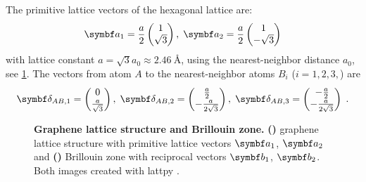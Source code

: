 \documentclass[../main.tex]{subfiles}
\begin{document}
The primitive lattice vectors of the hexagonal lattice are:
\begin{align}
	\vb{a}_1 = \frac{a}{2} \begin{pmatrix} 1 \\ \sqrt{3} \end{pmatrix}, \; \vb{a}_2 = \frac{a}{2} \begin{pmatrix} 1 \\ -\sqrt{3} \end{pmatrix}
\end{align}
with lattice constant \(a = \sqrt{3} a_0 \approx \SI{2.46}{\angstrom}\), using the nearest-neighbor distance \(a_0\), see \cref{sfig:graphene lattice structure}.
The vectors from atom \(A\) to the nearest-neighbor atoms \(B_i\) (\(i = 1, 2, 3,\)) are
\begin{align}
	\vb{\delta}_{AB, 1} = \begin{pmatrix} 0 \\ \frac{a}{\sqrt{3}} \end{pmatrix},\; \vb{\delta}_{AB, 2} = \begin{pmatrix} \frac{a}{2} \\ -\frac{a}{2\sqrt{3}} \end{pmatrix},\; \vb{\delta}_{AB, 3} = \begin{pmatrix} -\frac{a}{2} \\ -\frac{a}{2\sqrt{3}} \end{pmatrix}\;.
\end{align}
\begin{figure}[tb]
	\centering
	\begin{subfigure}[t]{0.5\textwidth}
		\centering
		\caption{\hfill\null}\label{sfig:graphene lattice structure}
		
	\end{subfigure}%
	\begin{subfigure}[t]{0.5\textwidth}
		\centering
		\caption{\hfill\null}\label{sfig:graphene Brillouin zone}
		
	\end{subfigure}
	\caption[Graphene lattice structure and Brillouin zone.]{\textbf{Graphene lattice structure and Brillouin zone.} \textbf{()} graphene lattice structure with primitive lattice vectors \(\vb{a}_1\), \(\vb{a}_2\) and \textbf{()} Brillouin zone with reciprocal vectors \(\vb{b}_1\), \(\vb{b}_2\). Both images created with lattpy \cite{Jones_lattpy_2022}.}
	\label{fig:graphene lattice structure and Brilluoin zone}
\end{figure}
\end{document}

